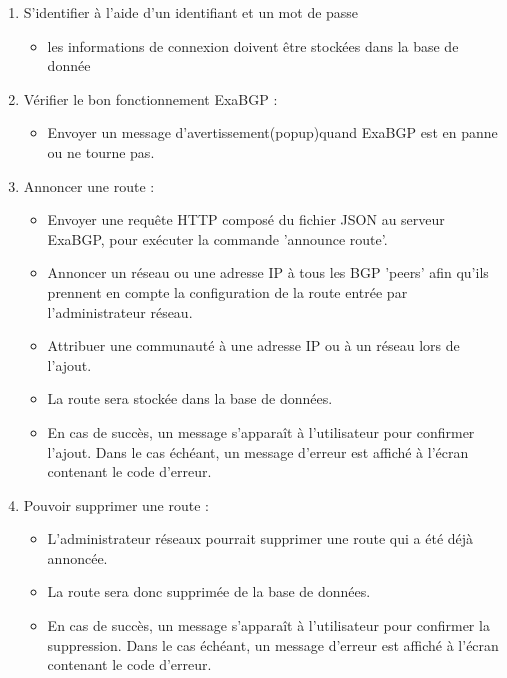 \begin{enumerate}

\item S'identifier à l'aide d'un identifiant et un mot de passe
	\begin{itemize}
		\item les informations de connexion doivent être stockées dans la base de donnée
	\end{itemize}

\item Vérifier le bon fonctionnement ExaBGP :
	\begin{itemize}
        \item Envoyer un message d'avertissement(popup)quand ExaBGP est en panne ou ne tourne pas.
	\end{itemize}

\item Annoncer une route : 
	\begin{itemize}
    	\item Envoyer une requête HTTP composé du fichier JSON au serveur ExaBGP, pour exécuter la commande 'announce route'.
		\item Annoncer un réseau ou une adresse IP à tous les BGP 'peers' afin qu'ils prennent en compte la configuration de la route entrée par l'administrateur réseau.
        \item Attribuer une communauté à une adresse IP ou à un réseau lors de l'ajout.
        \item La route sera stockée dans la base de données.
        \item En cas de succès, un message s’apparaît à l'utilisateur pour confirmer l'ajout. Dans le cas échéant, un message d'erreur est affiché à l'écran contenant le code d'erreur. 
	\end{itemize}
    
    \item Pouvoir supprimer une route :
	\begin{itemize}
		\item L'administrateur réseaux pourrait supprimer une route qui a été déjà annoncée.
        \item La route sera donc supprimée de la base de données.
        \item En cas de succès, un message s’apparaît à l'utilisateur pour confirmer la suppression. Dans le cas échéant, un message d'erreur est affiché à l'écran contenant le code d'erreur. 

	\end{itemize}
    

\end{enumerate}
